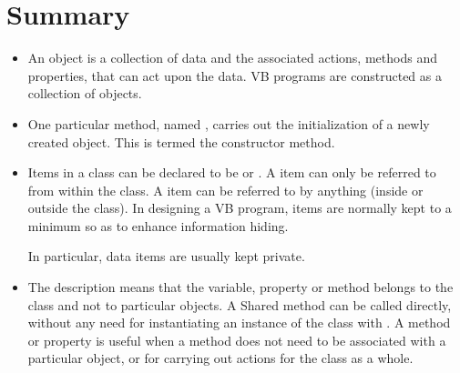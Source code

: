 	\section{Summary}
		\begin{itemize}
      \item An object is a collection of data and the associated actions, methods and properties, that can act upon the data. VB programs are constructed as a collection of objects.
      \item One particular method, named , carries out the initialization of a newly created object. This is termed the constructor method.
      \item Items in a class can be declared to be  or . A  item can only be referred to from within the class. A  item can be referred to by anything (inside or outside the class). In designing a VB program,  items are normally kept to a minimum so as to enhance information hiding. 
				
				In particular, data items are usually kept private.
			\item The description  means that the variable, property or method belongs to the class and not to particular objects. A Shared method can be called directly, without any need for instantiating an instance of the class with . A  method or property is useful when a method does not need to be associated with a particular object, or for carrying out actions for the class as a whole.
		\end{itemize}


